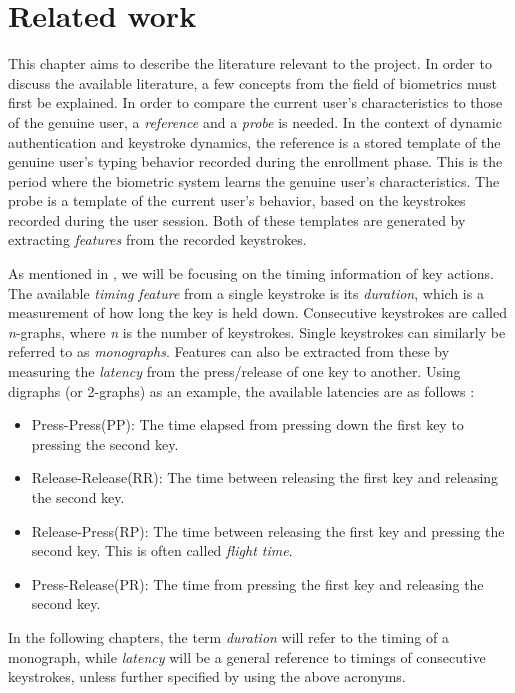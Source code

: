 \chapter{Related work}
\label{chap:related}
This chapter aims to describe the literature relevant to the project.
In order to discuss the available literature, a few concepts from the field of biometrics must first be explained.
In order to compare the current user's characteristics to those of the genuine user, a \textit{reference} and a \textit{probe} is needed.
In the context of dynamic authentication and keystroke dynamics, the reference is a stored template of the genuine user's typing behavior recorded during the enrollment phase. 
This is the period where the biometric system learns the genuine user's characteristics.
The probe is a template of the current user's behavior, based on the keystrokes recorded during the user session.
Both of these templates are generated by extracting \textit{features} from the recorded keystrokes.

As mentioned in , we will be focusing on the timing information of key actions.
The available \textit{timing feature} from a single keystroke is its \textit{duration}, which is a measurement of how long the key is held down.
Consecutive keystrokes are called \textit{n}-graphs, where \textit{n} is the number of keystrokes.
Single keystrokes can similarly be referred to as \textit{monographs}.
Features can also be extracted from these by measuring the \textit{latency} from the press/release of one key to another.
Using digraphs (or 2-graphs) as an example, the available latencies are as follows \cite{mondal}:
\begin{itemize}
    \item Press-Press(PP): The time elapsed from pressing down the first key to pressing the second key.
    \item Release-Release(RR): The time between releasing the first key and releasing the second key.
    \item Release-Press(RP): The time between releasing the first key and pressing the second key. This is often called \textit{flight time}.
    \item Press-Release(PR): The time from pressing the first key and releasing the second key.
\end{itemize}
In the following chapters, the term \textit{duration} will refer to the timing of a monograph, while \textit{latency} will be a general reference to timings of consecutive keystrokes, unless further specified by using the above acronyms.

